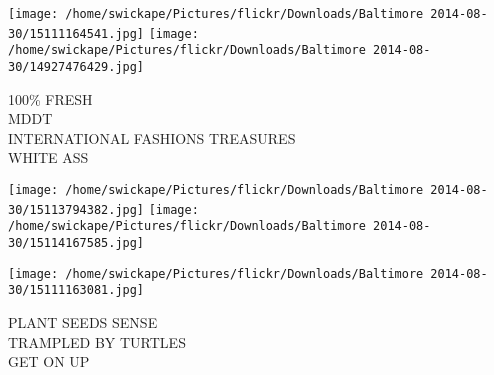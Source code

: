 \documentclass[10pt,letterpaper]{article}
\begin{document}
\texttt{[image: /home/swickape/Pictures/flickr/Downloads/Baltimore 2014-08-30/15111164541.jpg]}
\texttt{[image: /home/swickape/Pictures/flickr/Downloads/Baltimore 2014-08-30/14927476429.jpg]}

100\% FRESH\\
MDDT\\
INTERNATIONAL FASHIONS TREASURES\\
WHITE ASS
\pagebreak

\texttt{[image: /home/swickape/Pictures/flickr/Downloads/Baltimore 2014-08-30/15113794382.jpg]}
\texttt{[image: /home/swickape/Pictures/flickr/Downloads/Baltimore 2014-08-30/15114167585.jpg]}

\texttt{[image: /home/swickape/Pictures/flickr/Downloads/Baltimore 2014-08-30/15111163081.jpg]}

PLANT SEEDS SENSE\\
TRAMPLED BY TURTLES\\
GET ON UP
\pagebreak
\end{document}
